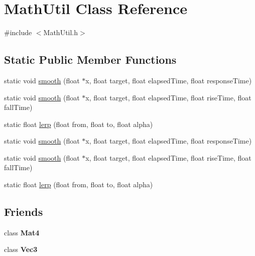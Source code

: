 \hypertarget{classMathUtil}{}\section{Math\+Util Class Reference}
\label{classMathUtil}


{\ttfamily \#include $<$Math\+Util.\+h$>$}

\subsection*{Static Public Member Functions}
\begin{DoxyCompactItemize}
\item 
static void \hyperlink{classMathUtil_a3db516e004fa913a6528face355ed7fb}{smooth} (float $\ast$x, float target, float elapsed\+Time, float response\+Time)
\item 
static void \hyperlink{classMathUtil_a12ff80eb6b3858289255ab3b5c06862d}{smooth} (float $\ast$x, float target, float elapsed\+Time, float rise\+Time, float fall\+Time)
\item 
static float \hyperlink{classMathUtil_a8cfb6e8c5fb0ba90034383fe6b90080d}{lerp} (float from, float to, float alpha)
\item 
static void \hyperlink{classMathUtil_a1891148f59e1bdc9070cf11ec14b9882}{smooth} (float $\ast$x, float target, float elapsed\+Time, float response\+Time)
\item 
static void \hyperlink{classMathUtil_a42537baed57e930799f8dd0049835ca8}{smooth} (float $\ast$x, float target, float elapsed\+Time, float rise\+Time, float fall\+Time)
\item 
static float \hyperlink{classMathUtil_acafaebe7647abc8a03a30be41e8363ae}{lerp} (float from, float to, float alpha)
\end{DoxyCompactItemize}
\subsection*{Friends}
\begin{DoxyCompactItemize}
\item 
\mbox{\label{classMathUtil_a1ff3aca4ae2244e46e07b8780b29bf1d}} 
class {\bfseries Mat4}
\item 
\mbox{\label{classMathUtil_ae5ffea56f26187d86e9bd0e1d676ee0b}} 
class {\bfseries Vec3}
\end{DoxyCompactItemize}



